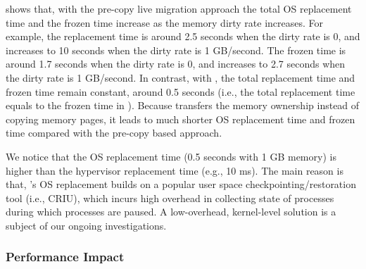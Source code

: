  shows that, with the pre-copy live migration approach the total OS replacement time and the frozen time increase as the memory dirty rate increases. For example, the replacement time is around 2.5 seconds when the dirty rate is 0, and increases to 10 seconds when the dirty rate is 1 GB/second. The frozen time is around 1.7 seconds when the dirty rate is 0, and increases to 2.7 seconds when the dirty rate is 1 GB/second. In contrast, with \arch, the total replacement time and frozen time remain constant, around 0.5 seconds (i.e., the total replacement time equals to the frozen time in \arch). Because \arch transfers the memory ownership instead of copying memory pages, it leads to much shorter OS replacement time and frozen time compared with the pre-copy based approach. 

We notice that the OS replacement time (0.5 seconds with 1 GB memory) is higher than the hypervisor replacement time (e.g., 10 ms). The main reason is that, \arch's OS replacement builds on a popular user space checkpointing/restoration tool (i.e., CRIU), which incurs high overhead in collecting state of processes during which processes are paused. A low-overhead, kernel-level solution is a subject of our ongoing investigations.




\subsubsection{Performance Impact}
\label{sec:workload}

